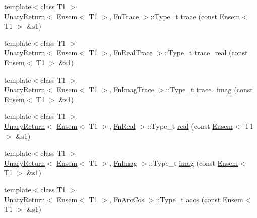\begin{DoxyCompactItemize}
\item 
{\footnotesize template$<$class T1 $>$ }\\\mbox{\hyperlink{structENSEM_1_1UnaryReturn}{Unary\+Return}}$<$ \mbox{\hyperlink{classENSEM_1_1Ensem}{Ensem}}$<$ T1 $>$, \mbox{\hyperlink{structENSEM_1_1FnTrace}{Fn\+Trace}} $>$\+::Type\+\_\+t \mbox{\hyperlink{group__eensem_ga11991a607d48e08d8be636503c1f5d20}{trace}} (const \mbox{\hyperlink{classENSEM_1_1Ensem}{Ensem}}$<$ T1 $>$ \&s1)
\item 
{\footnotesize template$<$class T1 $>$ }\\\mbox{\hyperlink{structENSEM_1_1UnaryReturn}{Unary\+Return}}$<$ \mbox{\hyperlink{classENSEM_1_1Ensem}{Ensem}}$<$ T1 $>$, \mbox{\hyperlink{structENSEM_1_1FnRealTrace}{Fn\+Real\+Trace}} $>$\+::Type\+\_\+t \mbox{\hyperlink{group__eensem_gad19d894f22555d78d30d2e186300fb11}{trace\+\_\+real}} (const \mbox{\hyperlink{classENSEM_1_1Ensem}{Ensem}}$<$ T1 $>$ \&s1)
\item 
{\footnotesize template$<$class T1 $>$ }\\\mbox{\hyperlink{structENSEM_1_1UnaryReturn}{Unary\+Return}}$<$ \mbox{\hyperlink{classENSEM_1_1Ensem}{Ensem}}$<$ T1 $>$, \mbox{\hyperlink{structENSEM_1_1FnImagTrace}{Fn\+Imag\+Trace}} $>$\+::Type\+\_\+t \mbox{\hyperlink{group__eensem_ga26802b2d0529b6b46a86cf2a04647476}{trace\+\_\+imag}} (const \mbox{\hyperlink{classENSEM_1_1Ensem}{Ensem}}$<$ T1 $>$ \&s1)
\item 
{\footnotesize template$<$class T1 $>$ }\\\mbox{\hyperlink{structENSEM_1_1UnaryReturn}{Unary\+Return}}$<$ \mbox{\hyperlink{classENSEM_1_1Ensem}{Ensem}}$<$ T1 $>$, \mbox{\hyperlink{structENSEM_1_1FnReal}{Fn\+Real}} $>$\+::Type\+\_\+t \mbox{\hyperlink{group__eensem_ga633b11ccc18bea07f60b3c9589dafe58}{real}} (const \mbox{\hyperlink{classENSEM_1_1Ensem}{Ensem}}$<$ T1 $>$ \&s1)
\item 
{\footnotesize template$<$class T1 $>$ }\\\mbox{\hyperlink{structENSEM_1_1UnaryReturn}{Unary\+Return}}$<$ \mbox{\hyperlink{classENSEM_1_1Ensem}{Ensem}}$<$ T1 $>$, \mbox{\hyperlink{structENSEM_1_1FnImag}{Fn\+Imag}} $>$\+::Type\+\_\+t \mbox{\hyperlink{group__eensem_gab3382717c5ea66ead42fa648ad4cefbc}{imag}} (const \mbox{\hyperlink{classENSEM_1_1Ensem}{Ensem}}$<$ T1 $>$ \&s1)
\item 
{\footnotesize template$<$class T1 $>$ }\\\mbox{\hyperlink{structENSEM_1_1UnaryReturn}{Unary\+Return}}$<$ \mbox{\hyperlink{classENSEM_1_1Ensem}{Ensem}}$<$ T1 $>$, \mbox{\hyperlink{structENSEM_1_1FnArcCos}{Fn\+Arc\+Cos}} $>$\+::Type\+\_\+t \mbox{\hyperlink{group__eensem_ga31bcbfa79251bff0ce60e7d8fb2b8ff3}{acos}} (const \mbox{\hyperlink{classENSEM_1_1Ensem}{Ensem}}$<$ T1 $>$ \&s1)

\end{DoxyCompactItemize}
